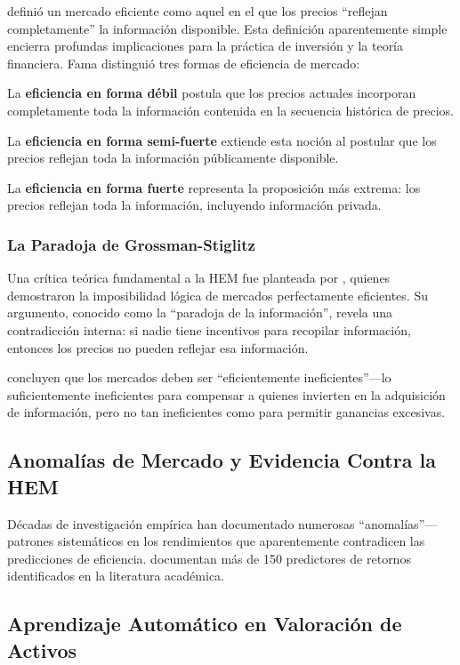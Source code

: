 \documentclass[11pt,a4paper]{article}
\begin{document}
\citet{fama1970} defini\'o un mercado eficiente como aquel en el que los precios ``reflejan completamente'' la informaci\'on disponible. Esta definici\'on aparentemente simple encierra profundas implicaciones para la pr\'actica de inversi\'on y la teor\'ia financiera. Fama distingui\'o tres formas de eficiencia de mercado:

La \textbf{eficiencia en forma d\'ebil} postula que los precios actuales incorporan completamente toda la informaci\'on contenida en la secuencia hist\'orica de precios.

La \textbf{eficiencia en forma semi-fuerte} extiende esta noci\'on al postular que los precios reflejan toda la informaci\'on p\'ublicamente disponible.

La \textbf{eficiencia en forma fuerte} representa la proposici\'on m\'as extrema: los precios reflejan toda la informaci\'on, incluyendo informaci\'on privada.

\subsubsection{La Paradoja de Grossman-Stiglitz}

Una cr\'itica te\'orica fundamental a la HEM fue planteada por \citet{grossman1980}, quienes demostraron la imposibilidad l\'ogica de mercados perfectamente eficientes. Su argumento, conocido como la ``paradoja de la informaci\'on'', revela una contradicci\'on interna: si nadie tiene incentivos para recopilar informaci\'on, entonces los precios no pueden reflejar esa informaci\'on.

\citet{grossman1980} concluyen que los mercados deben ser ``eficientemente ineficientes''---lo suficientemente ineficientes para compensar a quienes invierten en la adquisici\'on de informaci\'on, pero no tan ineficientes como para permitir ganancias excesivas.

\subsection{Anomal\'ias de Mercado y Evidencia Contra la HEM}

D\'ecadas de investigaci\'on emp\'irica han documentado numerosas ``anomal\'ias''---patrones sistem\'aticos en los rendimientos que aparentemente contradicen las predicciones de eficiencia. \citet{dong2022} documentan m\'as de 150 predictores de retornos identificados en la literatura acad\'emica.

\subsection{Aprendizaje Autom\'atico en Valoraci\'on de Activos}
\end{document}
